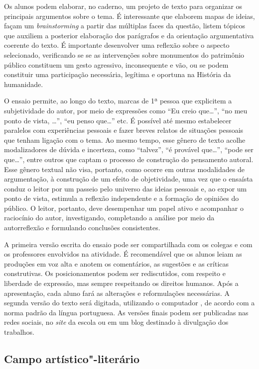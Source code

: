 \documentclass[12pt]{extarticle}
\begin{document}
Os alunos podem elaborar, no caderno, um projeto de texto para organizar
os principais argumentos sobre o tema. É interessante que elaborem mapas
de ideias, façam um \emph{brainstorming} a partir das múltiplas faces da
questão, listem tópicos que auxiliem a posterior elaboração dos
parágrafos e da orientação argumentativa coerente do texto. É importante
desenvolver uma reflexão sobre o aspecto selecionado, verificando se se
as intervenções sobre monumentos do patrimônio público constituem um
gesto agressivo, inconsequente e vão, ou se podem constituir uma
participação necessária, legítima e oportuna na História da humanidade.

O ensaio permite, ao longo do texto, marcas de 1ª pessoa que explicitem
a subjetividade do autor, por meio de expressões como ``Eu creio
que\ldots{}'', ``no meu ponto de vista, \ldots{}'', ``eu penso que\ldots{}'' etc. É
possível até mesmo estabelecer paralelos com experiências pessoais e
fazer breves relatos de situações pessoais que tenham ligação com o
tema. Ao mesmo tempo, esse gênero de texto acolhe modalizadores de
dúvida e incerteza, como ``talvez'', ``é provável que\ldots{}'', ``pode ser
que\ldots{}'', entre outros que captam o processo de construção do pensamento
autoral. Esse gênero textual não visa, portanto, como ocorre em outras
modalidades de argumentação, à construção de um efeito de objetividade,
uma vez que o ensaísta conduz o leitor por um passeio pelo universo das
ideias pessoais e, ao expor um ponto de vista, estimula a reflexão
independente e a formação de opiniões do público. O leitor, portanto,
deve desempenhar um papel ativo e acompanhar o raciocínio do autor,
investigando, completando a análise por meio da autorreflexão e
formulando conclusões consistentes.

A primeira versão escrita do ensaio pode ser compartilhada com os
colegas e com os professores envolvidos na atividade. É recomendável que
os alunos leiam as produções em voz alta e anotem os comentários, as
sugestões e as críticas construtivas. Os posicionamentos podem ser
rediscutidos, com respeito e liberdade de expressão, mas sempre
respeitando os direitos humanos. Após a apresentação, cada aluno fará as
alterações e reformulações necessárias. A segunda versão do texto será
digitada, utilizando o computador , de acordo com a norma padrão da
língua portuguesa. As versões finais podem ser publicadas nas redes
sociais, no \emph{site} da escola ou em um blog destinado à divulgação
dos trabalhos.

\subsection{Campo artístico"-literário}
\end{document}
